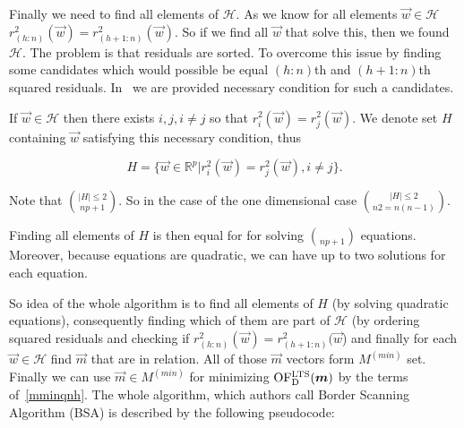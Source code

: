 Finally we need to find all elements of $\mathcal{H}$. As we know for all elements $\vec{w} \in \mathcal{H}$ $r^{2}_{(h:n)}(\vec{w}) = r^{2}_{(h+1:n)}(\vec{w})$. So if we find all $\vec{w}$ that solve this, then we found $\mathcal{H}$. The problem is that residuals are sorted. To overcome this issue by finding some candidates which would possible be equal $(h:n)$th and $(h+1:n)$th squared residuals. In~\cite{klouda2015exact} we are provided necessary condition for such a candidates.

\begin{definition}
    If $\vec{w} \in \mathcal{H}$ then there exists $i,j, i \neq j$ so that
     $r^{2}_i(\vec{w}) = r^{2}_j(\vec{w})$. We denote set $H$ containing $\vec{w}$ satisfying this necessary condition, thus

    \begin{equation}
        H = \{{ \vec{w} \in \mathbb{R}^p | r^{2}_i(\vec{w}) = r^{2}_j(\vec{w}), i \neq j  \}}.   
    \end{equation}
     
\end{definition}

Note that $|H| \leq 2 \choose{n}{p+1}$. So in  the case of the one dimensional case $|H| \leq 2 \choose{n}{2} = n(n-1)$.

Finding all elements of $H$ is then equal for for solving $\choose{n}{p+1}$ equations. Moreover, because equations are quadratic, we can have up to two solutions for each equation.

So idea of the whole algorithm is to find all elements of $H$ (by solving quadratic equations), consequently finding which of them are part of $\mathcal{H}$ (by ordering squared residuals and checking if $r^{2}_{(h:n)}(\vec{w}) = r^{2}_{(h+1:n)}(\vec{w}$) and finally for each $\vec{w} \in \mathcal{H}$ find $\vec{m}$ that are in relation. All of those $\vec{m}$ vectors form $M^{(min)}$ set. Finally we can use $\vec{m} \in M^{(min)}$ for minimizing $\operatorname{OF^{LTS}_D}(\boldsymbol{m})$ by the terms of~\eqref{mminqnh}. The whole algorithm, which authors call Border Scanning Algorithm (BSA) is described by the following pseudocode:

